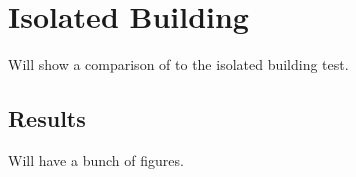 
\section{Isolated Building}

Will show a comparison of \anuga{} to the isolated building test.

\subsection{Results}


Will have a bunch of figures.




\endinput